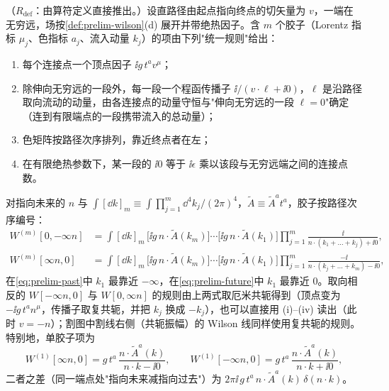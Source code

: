 \begin{proposition}\label{prop:prelim-wilson-rules}
（$R_{\mathrm{def}}$：由算符定义直接推出。）设直路径由起点指向终点的切矢量为 $v$，一端在无穷远，场按\cref{def:prelim-wilson}(d) 展开并带绝热因子。含 $m$ 个胶子（Lorentz 指标 $\mu_j$、色指标 $a_j$、流入动量 $k_j$）的项由下列"统一规则"给出：
\begin{enumerate}[label=(\roman*),leftmargin=2.2em,itemsep=0pt,topsep=2pt]
\item 每个连接点一个顶点因子 $\ii g\,t^{a}v^{\mu}$；
\item 除伸向无穷远的一段外，每一段一个程函传播子 $\ii/(v\cdot\ell+\ii0)$，$\ell$ 是沿路径取向流动的动量，由各连接点的动量守恒与"伸向无穷远的一段 $\ell=0$"确定（连到有限端点的一段携带流入的总动量）；
\item 色矩阵按路径次序排列，靠近终点者在左；
\item 在有限绝热参数下，某一段的 $\ii0$ 等于 $\ii\epsilon$ 乘以该段与无穷远端之间的连接点数。
\end{enumerate}
对指向未来的 $n$ 与 $\int[\dd k]_m\equiv\int\prod_{j=1}^m\dd^4k_j/(2\pi)^4$，$\tilde A\equiv\tilde A^at^a$，胶子按路径次序编号：%
\begin{align}
W^{(m)}[0,-\infty n]&=\int[\dd k]_m\,\big[\ii g\,n\cdot\tilde A(k_m)\big]\cdots\big[\ii g\,n\cdot\tilde A(k_1)\big]\prod_{j=1}^m\frac{\ii}{n\cdot(k_1+\dots+k_j)+\ii0},\label{eq:prelim-past}\\
W^{(m)}[\infty n,0]&=\int[\dd k]_m\,\big[\ii g\,n\cdot\tilde A(k_m)\big]\cdots\big[\ii g\,n\cdot\tilde A(k_1)\big]\prod_{j=1}^m\frac{-\ii}{n\cdot(k_j+\dots+k_m)-\ii0},\label{eq:prelim-future}
\end{align}
在\cref{eq:prelim-past}中 $k_1$ 最靠近 $-\infty$，在\cref{eq:prelim-future}中 $k_1$ 最靠近 $0$。取向相反的 $W[-\infty n,0]$ 与 $W[0,\infty n]$ 的规则由上两式取厄米共轭得到（顶点变为 $-\ii g\,t^an^\mu$，传播子取复共轭，并把 $k_j$ 换成 $-k_j$），也可以直接用 (i)--(iv) 读出（此时 $v=-n$）；割图中割线右侧（共轭振幅）的 Wilson 线同样使用复共轭的规则。特别地，单胶子项为
\begin{equation}\label{eq:prelim-one-gluon}
W^{(1)}[\infty n,0]=g\,t^a\,\frac{n\cdot\tilde A^a(k)}{n\cdot k-\ii0},\qquad W^{(1)}[-\infty n,0]=g\,t^a\,\frac{n\cdot\tilde A^a(k)}{n\cdot k+\ii0},
\end{equation}
二者之差（同一端点处"指向未来减指向过去"）为 $2\pi\ii\,g\,t^a\,n\cdot\tilde A^a(k)\,\delta(n\cdot k)$。
\end{proposition}

